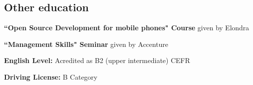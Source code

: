 \documentclass[margin,line]{resume}
\begin{document}
\begin{resume}
\vspace{+.2in}
\section{\sc Other education } 
\begin{list1}
\item[] {\bf ``Open Source Development for mobile phones" Course} given by Elondra
\item[] {\bf ``Management Skills" Seminar} given by Accenture
\item[] {\bf English Level:} Acredited as B2 (upper intermediate) CEFR
\item[] {\bf Driving License:} B Category
\end{list1}


%
%
%
%
%
%
%
%
%
\end{resume}
\end{document}

